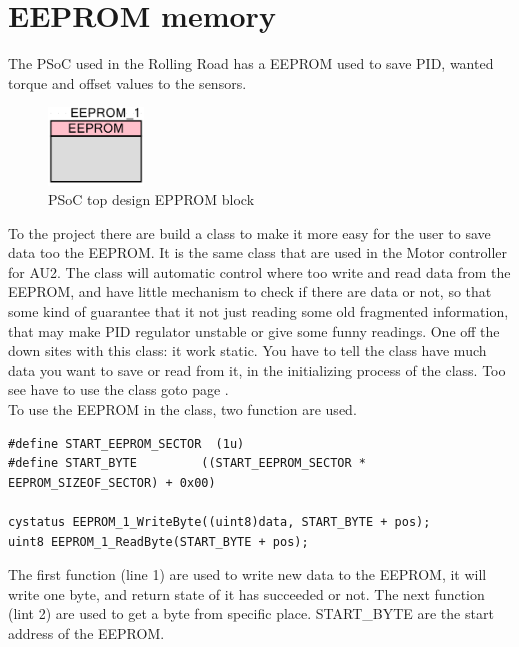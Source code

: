 \newpage
\section{EEPROM memory}
The PSoC used in the Rolling Road has a EEPROM used to save PID, wanted torque and offset values to the sensors.

\begin{figure}[H] 
	\centering
	\includegraphics [width=1in]{Software/Pictures/EEPROM_block.PNG}
	\caption{PSoC top design EPPROM block}
	\label{fig:EEPROM_block}
\end{figure}

To the project there are build a class to make it more easy for the user to save data too the EEPROM. It is the same class that are used in the Motor controller for AU2. The class will automatic control where too write and read data from the EEPROM, and have little mechanism to check if there are data or not, so that some kind of guarantee that it not just reading some old fragmented information, that may make PID regulator unstable or give some funny readings. One off the down sites with this class: it work static. You have to tell the class have much data you want to save or read from it, in the initializing process of the class. Too see have to use the class goto page \pageref{table:Class_description_EEPROM_RR_PSoC}. \\
To use the EEPROM in the class, two function are used.

\lstset{language=C}
\begin{lstlisting}
#define START_EEPROM_SECTOR  (1u)
#define START_BYTE         ((START_EEPROM_SECTOR * EEPROM_SIZEOF_SECTOR) + 0x00)

cystatus EEPROM_1_WriteByte((uint8)data, START_BYTE + pos);
uint8 EEPROM_1_ReadByte(START_BYTE + pos);
\end{lstlisting}

The first function (line 1) are used to write new data to the EEPROM, it will write one byte, and return state of it has succeeded or not. The next function (lint 2) are used to get a byte from specific place. START\_BYTE are the start address of the EEPROM. 